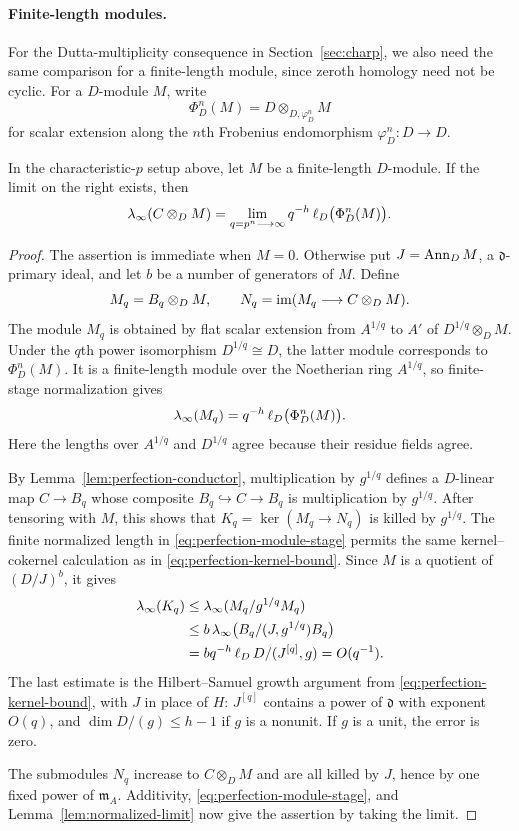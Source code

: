\paragraph{Finite-length modules.}
For the Dutta-multiplicity consequence in
Section~\ref{sec:charp}, we also need the same comparison for a
finite-length module, since zeroth homology need not be cyclic.
For a $D$-module $M$, write
\[
 \Phi_D^n(M)=D\otimes_{D,\varphi_D^n}M
\]
for scalar extension along the $n$th Frobenius endomorphism
$\varphi_D^n:D\to D$.

\begin{lemma}\label{lem:perfection-finite-length}
In the characteristic-$p$ setup above, let $M$ be a finite-length
$D$-module.  If the limit on the right exists, then
\[
 \lambda_\infty(C\otimes_D M)
   =\lim_{q=p^n\longrightarrow\infty}
           q^{-h}\operatorname{\ell}_D\bigl(\Phi_D^n(M)\bigr).
\]
\end{lemma}

\begin{proof}
The assertion is immediate when $M=0$.  Otherwise put
$J=\operatorname{Ann}_D M$, a $\mathfrak d$-primary ideal, and let $b$ be a number
of generators of $M$.  Define
\[
 M_q=B_q\otimes_D M,\qquad
 N_q=\operatorname{im}(M_q\longrightarrow C\otimes_D M).
\]
The module $M_q$ is obtained by flat scalar extension from
$A^{1/q}$ to $A'$ of
$D^{1/q}\otimes_D M$.  Under the $q$th power isomorphism
$D^{1/q}\cong D$, the latter module corresponds to $\Phi_D^n(M)$.
It is a finite-length module over the Noetherian ring $A^{1/q}$,
so finite-stage normalization gives
\begin{equation}\label{eq:perfection-module-stage}
 \lambda_\infty(M_q)=q^{-h}\operatorname{\ell}_D\bigl(\Phi_D^n(M)\bigr).
\end{equation}
Here the lengths over $A^{1/q}$ and $D^{1/q}$ agree because their
residue fields agree.

By Lemma~\ref{lem:perfection-conductor}, multiplication by $g^{1/q}$
defines a $D$-linear map $C\to B_q$ whose composite
$B_q\hookrightarrow C\to B_q$ is multiplication by $g^{1/q}$.
After tensoring with $M$, this shows that
$K_q=\ker(M_q\to N_q)$ is killed by $g^{1/q}$.  The finite normalized
length in \eqref{eq:perfection-module-stage} permits the same kernel--cokernel
calculation as in \eqref{eq:perfection-kernel-bound}.  Since $M$ is a
quotient of $(D/J)^b$, it gives
\begin{align*}
 \lambda_\infty(K_q)
 &\leq \lambda_\infty(M_q/g^{1/q}M_q)\\
 &\leq b\,\lambda_\infty\bigl(B_q/(J,g^{1/q})B_q\bigr)\\
 &=bq^{-h}\operatorname{\ell}_D D/(J^{[q]},g)=O(q^{-1}).
\end{align*}
The last estimate is the Hilbert--Samuel growth argument from
\eqref{eq:perfection-kernel-bound}, with $J$ in place of $H$:
$J^{[q]}$ contains a power of
$\mathfrak d$ with exponent $O(q)$, and $\dim D/(g)\leq h-1$ if
$g$ is a nonunit.  If $g$ is a unit, the error is zero.

The submodules $N_q$ increase to $C\otimes_D M$ and are all killed
by $J$, hence by one fixed power of $\mathfrak m_A$.  Additivity,
\eqref{eq:perfection-module-stage}, and
Lemma~\ref{lem:normalized-limit} now give the assertion by taking
the limit.
\end{proof}

